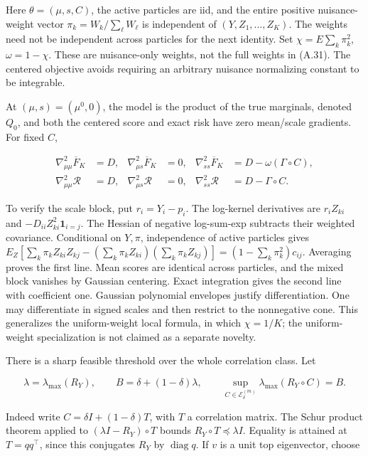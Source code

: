 \documentclass{article}
\begin{document}
Here \(\theta=(\mu,s,C)\), the active particles are iid, and the entire
positive nuisance-weight vector \(\pi_k=W_k/\sum_\ell W_\ell\) is
independent of \((Y,Z_1,\ldots,Z_K)\). The weights need not be
independent across particles for the next identity. Set
\(\chi=E\sum_k\pi_k^2\), \(\omega=1-\chi\). These are nuisance-only
weights, not the full weights in (A.31). The centered objective avoids
requiring an arbitrary nuisance normalizing constant to be integrable.

At \((\mu,s)=(\mu^0,0)\), the model is the product of the true
marginals, denoted \(Q_0\), and both the centered score and exact risk
have zero mean/scale gradients. For fixed \(C\),

\[
\begin{aligned}
\nabla^2_{\mu\mu}\overline F_K&=D,&\nabla^2_{\mu s}\overline F_K&=0,&
\nabla^2_{ss}\overline F_K&=D-\omega(\Gamma\circ C),\\
\nabla^2_{\mu\mu}\mathcal R&=D,&\nabla^2_{\mu s}\mathcal R&=0,&
\nabla^2_{ss}\mathcal R&=D-\Gamma\circ C.
\end{aligned}
\tag{A.38}
\]

To verify the scale block, put \(r_i=Y_i-p_i\). The log-kernel
derivatives are \(r_iZ_{ki}\) and \(-D_{ii}Z_{ki}^2\mathbf1_{i=j}\). The
Hessian of negative log-sum-exp subtracts their weighted covariance.
Conditional on \(Y,\pi\), independence of active particles gives
\(E_Z[\sum_k\pi_kZ_{ki}Z_{kj}-(\sum_k\pi_kZ_{ki})(\sum_k\pi_kZ_{kj})]=(1-\sum_k\pi_k^2)c_{ij}\).
Averaging proves the first line. Mean scores are identical across
particles, and the mixed block vanishes by Gaussian centering. Exact
integration gives the second line with coefficient one. Gaussian
polynomial envelopes justify differentiation. One may differentiate in
signed scales and then restrict to the nonnegative cone. This
generalizes the uniform-weight local formula, in which \(\chi=1/K\); the
uniform-weight specialization is not claimed as a separate novelty.

There is a sharp feasible threshold over the whole correlation class.
Let

\[
\lambda=\lambda_{\max}(R_Y),\qquad B=\delta+(1-\delta)\lambda,
\qquad \sup_{C\in\mathcal E_\delta^{(m)}}\lambda_{\max}(R_Y\circ C)=B.
\tag{A.39}
\]

Indeed write \(C=\delta I+(1-\delta)T\), with \(T\) a correlation
matrix. The Schur product theorem applied to \((\lambda I-R_Y)\circ T\)
bounds \(R_Y\circ T\preceq\lambda I\). Equality is attained at
\(T=qq^\top\), since this conjugates \(R_Y\) by
\(\operatorname{diag}q\). If \(v\) is a unit top eigenvector, choose
\end{document}
